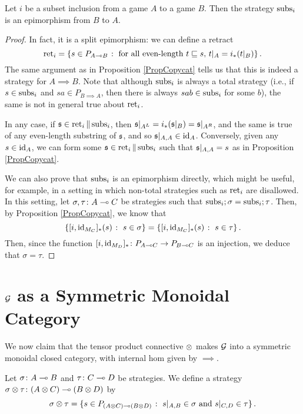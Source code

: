 \documentclass[11pt]{report}
\begin{document}
\begin{proposition}
  Let $i$ be a subset inclusion from a game $A$ to a game $B$.  
  Then the strategy $\operatorname{subs}_i$ is an epimorphism from $B$ to $A$.
  \label{PropSubsetInclusionEpic}
\end{proposition}
\begin{proof}
  In fact, it is a split epimorphism: we can define a retract
  \[
    \operatorname{ret}_i = \{s\in P_{A\multimap B}\;\colon\;\text{for all even-length $t\sqsubseteq s$, $t\vert_A=i_*(t\vert_B)$}\}\,.
    \]
  The same argument as in Proposition \ref{PropCopycat} tells us that this is indeed a strategy for $A\implies B$.
  Note that although $\operatorname{subs}_i$ is always a total strategy (i.e., if $s\in\operatorname{subs}_i$ and $sa\in P_{B\implies A}$, then there is always $sab\in\operatorname{subs}_i$ for some $b$), the same is not in general true about $\operatorname{ret}_i$.  

  In any case, if $\mathfrak s\in\operatorname{ret}_i\|\operatorname{subs}_i$, then $\mathfrak s\vert_{A^L} = i_*(\mathfrak s\vert_B) = \mathfrak s\vert_{A^R}$, and the same is true of any even-length substring of $\mathfrak s$, and so $\mathfrak s\vert_{A,A}\in\operatorname{id}_A$.  
  Conversely, given any $s\in \operatorname{id}_A$, we can form some $\mathfrak s\in\operatorname{ret}_i\|\operatorname{subs}_i$ such that $\mathfrak s\vert_{A,A}=s$ as in Proposition \ref{PropCopycat}.

  We can also prove that $\operatorname{subs}_i$ is an epimorphism directly, which might be useful, for example, in a setting in which non-total strategies such as $\operatorname{ret}_i$ are disallowed.  
  In this setting, let $\sigma,\tau\colon A \multimap C$ be strategies such that $\operatorname{subs}_i;\sigma=\operatorname{subs}_i;\tau$.  
  Then, by Proposition \ref{PropCopycat}, we know that
  \[
    \{[i,\operatorname{id}_{M_C}]_*(s)\;\colon\; s\in\sigma\}
    =
    \{[i,\operatorname{id}_{M_C}]_*(s)\;\colon\; s\in\tau\}\,.
    \]
  Then, since the function $[i,\operatorname{id}_{M_D}]_* \colon P_{A\multimap C} \to P_{B\multimap C}$ is an injection, we deduce that $\sigma=\tau$.
\end{proof}

\section{$\mathcal G$ as a Symmetric Monoidal Category}

We now claim that the tensor product connective $\otimes$ makes $\mathcal G$ into a symmetric monoidal closed category, with internal hom given by $\implies$.  

\begin{definition}
  Let $\sigma\colon A \multimap B$ and $\tau\colon C \multimap D$ be strategies.  
  We define a strategy $\sigma\otimes\tau\colon (A\otimes C) \multimap (B \otimes D)$ by
  \[
    \sigma\otimes\tau = \{s\in P_{(A\otimes C)\multimap (B\otimes D)}\;\colon\; s\vert_{A,B}\in\sigma\text{ and }s\vert_{C,D}\in\tau\}\,.
    \]
\end{definition}
\end{document}
